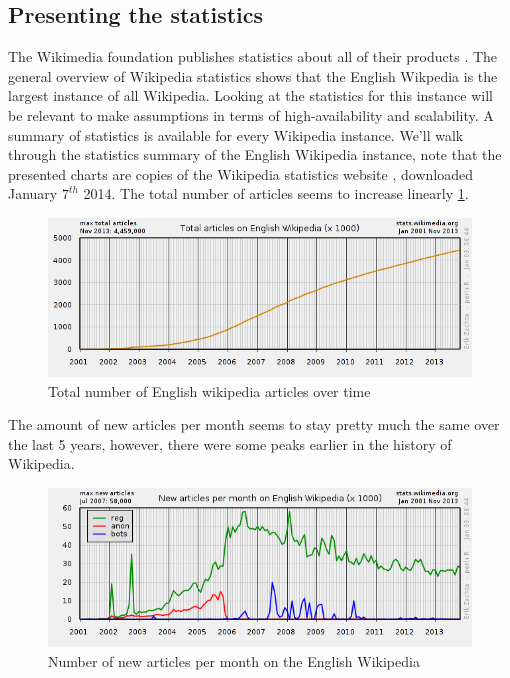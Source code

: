 \documentclass[12pt]{report}
\begin{document}
\subsection{Presenting the statistics}
The Wikimedia foundation publishes statistics about all of their
products \cite{stats_wikimedia}. The general overview of Wikipedia
statistics \cite{stats_wikipedia} shows that the English Wikpedia is
the largest instance of all Wikipedia. Looking at the statistics for
this instance will be relevant to make assumptions in terms of
high-availability and scalability.
A summary of statistics is available for every Wikipedia instance.
We'll walk through the statistics summary of the English Wikipedia
instance, note that the presented charts are copies of the Wikipedia
statistics website \cite{stats_wikipedia}, downloaded January $7^{th}$
2014.
The total number of articles seems to increase linearly \ref{wikipedia_nr_articles_over_time}.
\begin{figure}[h!]
  \caption{Total number of English wikipedia articles over time}
  \label{wikipedia_nr_articles_over_time}
  \centering
    \includegraphics[scale=0.5]{pics/wikipedia_nr_articles_over_time.png}
\end{figure}
The amount of new articles per month seems to stay pretty much the
same over the last 5 years, however, there were some peaks earlier in
the history of Wikipedia.
\begin{figure}[h!]
  \caption{Number of new articles per month on the English Wikipedia}
  \label{wikipedia_new_articles_per_month}
  \centering
    \includegraphics[scale=0.5]{pics/wikipedia_new_articles_per_month.png}
\end{figure}
\end{document}
